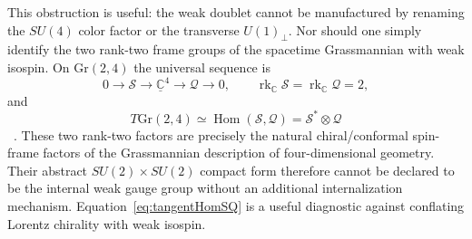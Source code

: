 \documentclass[11pt]{article}
\newcommand{\Gr}{\mathrm{Gr}}
\theoremstyle{definition}\newtheorem{definition}[theorem]{Definition}
\theoremstyle{remark}\newtheorem{remark}[theorem]{Remark}\newtheorem{conjecture}[theorem]{Conjecture}
\begin{document}
This obstruction is useful: the weak doublet cannot be manufactured by renaming the $SU(4)$ color factor or the transverse $U(1)_\perp$. Nor should one simply identify the two rank-two frame groups of the spacetime Grassmannian with weak isospin. On $\Gr(2,4)$ the universal sequence is
\begin{equation}\label{eq:tautologicalsequence}
 0\longrightarrow\mathcal S\longrightarrow
 \underline{\mathbb C}^{4}\longrightarrow\mathcal Q\longrightarrow0,
 \qquad
 \operatorname{rk}_{\mathbb C}\mathcal S=
 \operatorname{rk}_{\mathbb C}\mathcal Q=2,
\end{equation}
and
\begin{equation}\label{eq:tangentHomSQ}
 T\Gr(2,4)\simeq\operatorname{Hom}(\mathcal S,\mathcal Q)
 =\mathcal S^*\otimes\mathcal Q
\end{equation}
~\cite{BottTu1982}. These two rank-two factors are precisely the natural chiral/conformal spin-frame factors of the Grassmannian description of four-dimensional geometry. Their abstract $SU(2)\times SU(2)$ compact form therefore cannot be declared to be the internal weak gauge group without an additional internalization mechanism. Equation~\eqref{eq:tangentHomSQ} is a useful diagnostic against conflating Lorentz chirality with weak isospin.
\end{document}
